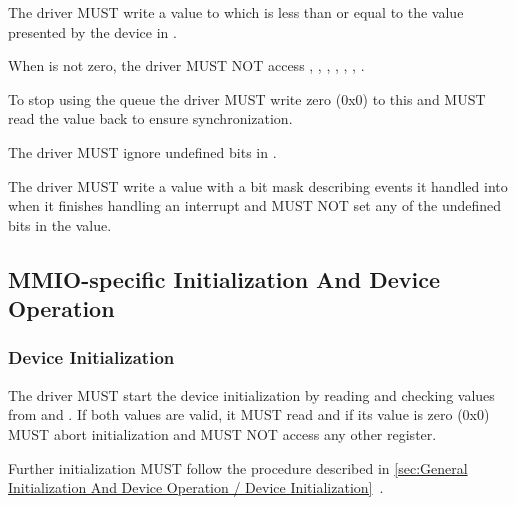 The driver MUST write a value to  which is less than
or equal to the value presented by the device in .

When  is not zero, the driver MUST NOT access
, , ,
, , , .

To stop using the queue the driver MUST write zero (0x0) to this
 and MUST read the value back to ensure
synchronization.

The driver MUST ignore undefined bits in .

The driver MUST write a value with a bit mask describing events it handled into  when
it finishes handling an interrupt and MUST NOT set any of the undefined bits in the value.

\subsection{MMIO-specific Initialization And Device Operation}\label{sec:Virtio Transport Options / Virtio Over MMIO / MMIO-specific Initialization And Device Operation}

\subsubsection{Device Initialization}\label{sec:Virtio Transport Options / Virtio Over MMIO / MMIO-specific Initialization And Device Operation / Device Initialization}


The driver MUST start the device initialization by reading and
checking values from  and .
If both values are valid, it MUST read 
and if its value is zero (0x0) MUST abort initialization and
MUST NOT access any other register.

Further initialization MUST follow the procedure described in
\ref{sec:General Initialization And Device Operation / Device Initialization}~.

